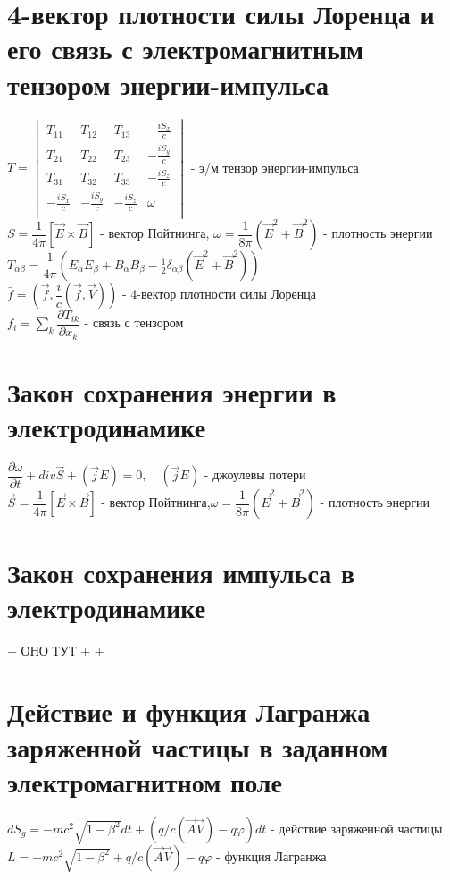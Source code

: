 \begin{multicols*}{2}
		\section{4-вектор плотности силы Лоренца и его связь с электромагнитным тензором энергии-импульса}
		$T = \begin{vmatrix}
			T_{11}& T_{12}& T_{13}& -\frac{iS_x}{c}\\
			T_{21}& T_{22}& T_{23}& -\frac{iS_y}{c}\\
			T_{31}& T_{32}& T_{33}& -\frac{iS_z}{c}\\
			-\frac{iS_x}{c}& -\frac{iS_y}{c}& -\frac{iS_z}{c}& \omega \\
		\end{vmatrix}$ - э/м тензор энергии-импульса\\
		$S = \dfrac{1}{4\pi}\left[\vec{E}\times \vec{B}\right]$ - вектор Пойтнинга, \quad $\omega = \dfrac{1}{8\pi}(\vec{E}^2 + \vec{B}^2)$ - плотность энергии\\
		$T_{\alpha \beta} = \dfrac{1}{4\pi}(E_\alpha E_\beta + B_\alpha B_\beta - \frac{1}{2}\delta_{\alpha \beta}(\vec{E}^2 + \vec{B}^2))$\\
		$\bar{f} = (\vec{f}, \dfrac{i}{c}(\vec{f}, \vec{V}))$ - 4-вектор плотности силы Лоренца\\
		$f_i = \sum_{k}^{} \dfrac{\partial T_{ik}}{\partial x_k}$ - связь с тензором

		\section{Закон сохранения энергии в электродинамике}
		$\dfrac{\partial \omega}{\partial t} + div \vec{S} + (\vec{j}E) = 0, \quad (\vec{j}E)$ - джоулевы потери\\
		$\vec{S} = \dfrac{1}{4\pi}\left[\vec{E}\times \vec{B}\right]$ - вектор Пойтнинга,\quad $\omega = \dfrac{1}{8\pi}(\vec{E}^2 + \vec{B}^2)$ - плотность энергии
		
		\section{Закон сохранения импульса в электродинамике}

		+
		ОНО ТУТ
		+
		+

		
		\section{Действие и функция Лагранжа заряженной частицы в заданном электромагнитном поле}
		$dS_g = -mc^2\sqrt{1-\beta^2} dt + (q/c(\vec{A}\vec{V}) - q\varphi)dt$ - действие заряженной частицы\\
		$L = -mc^2\sqrt{1-\beta^2} + q/c(\vec{A}\vec{V}) - q\varphi$ - функция Лагранжа
		

\end{multicols*}
